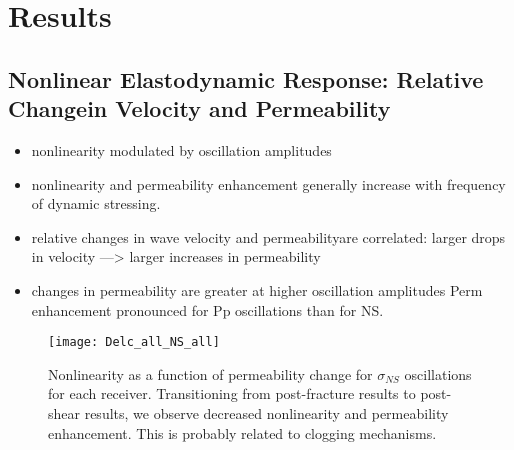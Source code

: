 \documentclass[letterpaper,10pt]{article}
\begin{document}
%
%

\section{Results}
\subsection{Nonlinear Elastodynamic Response: Relative Changein Velocity and Permeability}
\begin{itemize}
	\item nonlinearity modulated by oscillation amplitudes
\item nonlinearity and permeability enhancement generally increase with frequency of dynamic stressing.
\item relative changes in wave velocity and permeabilityare correlated: larger drops in velocity —> larger increases in permeability
\item changes in permeability are greater at higher oscillation amplitudes 
\subitem Perm enhancement pronounced for Pp oscillations than for NS.
\end{itemize}

\begin{figure}[ht]
	\centering
	\texttt{[image: Delc\_all\_NS\_all]}
	\caption{Nonlinearity as a function of permeability change for $ \sigma_{NS} $ oscillations for each receiver. Transitioning from post-fracture results to post-shear results, we observe decreased nonlinearity and permeability enhancement. This is probably related to clogging mechanisms.}%
	\label{fig:delc_plots}
\end{figure}
\end{document}
